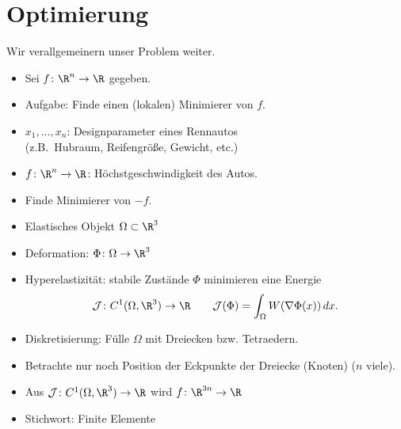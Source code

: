 \chapter{Optimierung}

Wir verallgemeinern unser Problem weiter.

\begin{itemize}
 \item Sei $f \colon \R^n \to \R$ gegeben.
 \item Aufgabe: Finde einen (lokalen) Minimierer von $f$.
\end{itemize}

\begin{bsp}
\begin{itemize}
 \item $x_1,\ldots,x_n$: Designparameter eines Rennautos \\ (z.B.\ Hubraum, Reifengröße, Gewicht, etc.)
 \item $f \colon \R^n \to \R$: Höchstgeschwindigkeit des Autos.
 \item Finde Minimierer von $-f$.
\end{itemize}
\end{bsp}

\medskip

\begin{bsp}[Festkörpermechanik]
\begin{itemize}
 \item Elastisches Objekt $\Omega \subset \R^3$
 \item Deformation: $\Phi \colon \Omega \to \R^3$
 \item Hyperelastizität: stabile Zustände $\Phi$ minimieren eine Energie
  \begin{equation*}
   \mathcal{J} \colon C^1(\Omega,\R^3) \to \R
   \qquad
   \mathcal{J}(\Phi) = \int_{\Omega} W(\nabla \Phi(x))\,dx.
  \end{equation*}
 \item Diskretisierung: Fülle $\Omega$ mit Dreiecken bzw. Tetraedern.
 \item Betrachte nur noch Position der Eckpunkte der Dreiecke (Knoten) ($n$ viele).
 \item Aus $\mathcal{J} \colon C^1(\Omega,\R^3) \to \R$ wird $f \colon \R^{3n} \to \R$
 \item Stichwort: Finite Elemente
\end{itemize}
\end{bsp}

\bigskip

